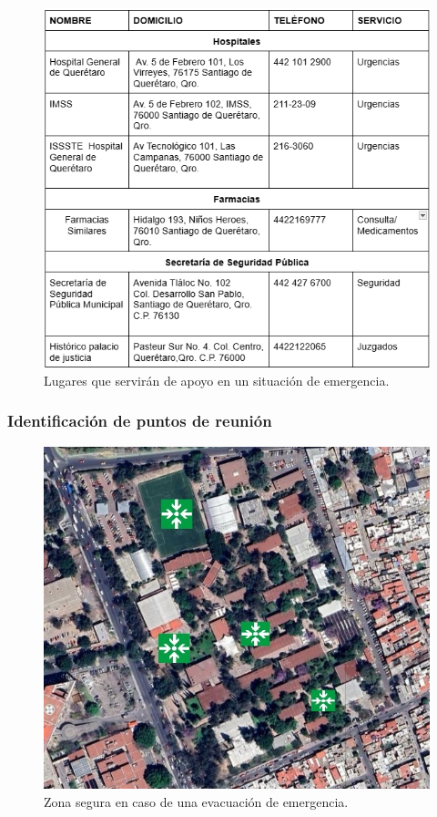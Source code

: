     \begin{figure}[H]
        \centering
        \includegraphics[scale=0.5]{35/Img/apoyosExternos.png}
        \caption{Lugares que servirán de apoyo en un situación de emergencia.}
    \end{figure}
    
    \subsubsection{Identificación de puntos de reunión}
    
    \begin{figure}[H]
        \centering
        \includegraphics[scale=0.4]{35/Img/puntosReunion.jpg}
        \caption{Zona segura en caso de una evacuación de emergencia.}
    \end{figure}
    
